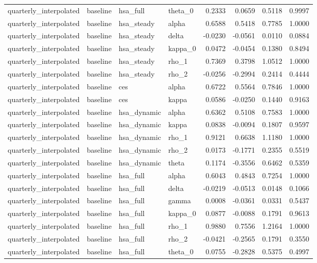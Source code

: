 \begin{tabular}{llllrrrr}
quarterly\_interpolated & baseline & hsa\_full & theta\_0 & 0.2333 & 0.0659 & 0.5118 & 0.9997 \\
quarterly\_interpolated & baseline & hsa\_steady & alpha & 0.6588 & 0.5418 & 0.7785 & 1.0000 \\
quarterly\_interpolated & baseline & hsa\_steady & delta & -0.0230 & -0.0561 & 0.0110 & 0.0884 \\
quarterly\_interpolated & baseline & hsa\_steady & kappa\_0 & 0.0472 & -0.0454 & 0.1380 & 0.8494 \\
quarterly\_interpolated & baseline & hsa\_steady & rho\_1 & 0.7369 & 0.3798 & 1.0512 & 1.0000 \\
quarterly\_interpolated & baseline & hsa\_steady & rho\_2 & -0.0256 & -0.2994 & 0.2414 & 0.4444 \\
quarterly\_interpolated & baseline & ces & alpha & 0.6722 & 0.5564 & 0.7846 & 1.0000 \\
quarterly\_interpolated & baseline & ces & kappa & 0.0586 & -0.0250 & 0.1440 & 0.9163 \\
quarterly\_interpolated & baseline & hsa\_dynamic & alpha & 0.6362 & 0.5108 & 0.7583 & 1.0000 \\
quarterly\_interpolated & baseline & hsa\_dynamic & kappa & 0.0838 & -0.0094 & 0.1807 & 0.9597 \\
quarterly\_interpolated & baseline & hsa\_dynamic & rho\_1 & 0.9121 & 0.6638 & 1.1180 & 1.0000 \\
quarterly\_interpolated & baseline & hsa\_dynamic & rho\_2 & 0.0173 & -0.1771 & 0.2355 & 0.5519 \\
quarterly\_interpolated & baseline & hsa\_dynamic & theta & 0.1174 & -0.3556 & 0.6462 & 0.5359 \\
quarterly\_interpolated & baseline & hsa\_full & alpha & 0.6043 & 0.4843 & 0.7254 & 1.0000 \\
quarterly\_interpolated & baseline & hsa\_full & delta & -0.0219 & -0.0513 & 0.0148 & 0.1066 \\
quarterly\_interpolated & baseline & hsa\_full & gamma & 0.0008 & -0.0361 & 0.0331 & 0.5437 \\
quarterly\_interpolated & baseline & hsa\_full & kappa\_0 & 0.0877 & -0.0088 & 0.1791 & 0.9613 \\
quarterly\_interpolated & baseline & hsa\_full & rho\_1 & 0.9880 & 0.7556 & 1.2164 & 1.0000 \\
quarterly\_interpolated & baseline & hsa\_full & rho\_2 & -0.0421 & -0.2565 & 0.1791 & 0.3550 \\
quarterly\_interpolated & baseline & hsa\_full & theta\_0 & 0.0755 & -0.2828 & 0.5375 & 0.4997 \\

\end{tabular}
